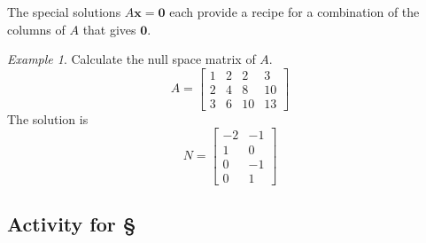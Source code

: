 \documentclass[11pt,oneside]{amsbook}
\theoremstyle{definition}
\theoremstyle{plain}
\theoremstyle{definition}
\theoremstyle{remark}
\newtheorem{example}[theorem]{Example}
\numberwithin{equation}{section}
\numberwithin{figure}{section}
\begin{document}
The special solutions $A\mathbf{x}=\mathbf{0}$ each provide a recipe for a combination of the columns of $A$ that gives $\mathbf{0}$.

\begin{example}
  Calculate the null space matrix of $A$.
  \[A=\begin{bmatrix}1&2&2&3\\2&4&8&10\\3&6&10&13\end{bmatrix}
  \]
  The solution is
  \[N=\begin{bmatrix}-2&-1\\1&0\\0&-1\\0&1\end{bmatrix}
  \]
\end{example}



\newpage
\subsection*{Activity for \S \thesection}

\end{document}
